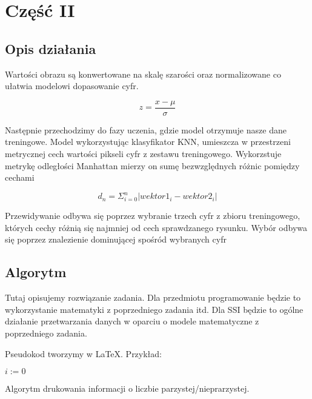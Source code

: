 \documentclass[12pt,a4paper]{article}
\begin{document}
	\section*{Część II}
	\subsection*{Opis działania} 
    Wartości obrazu są konwertowane na skalę szarości oraz normalizowane co ułatwia modelowi dopasowanie cyfr.

    \[
            z=\frac{x-\mu}{\sigma}
    \]

    Następnie przechodzimy do fazy uczenia, gdzie model otrzymuje nasze dane treningowe. Model wykorzystując klasyfikator KNN, umieszcza w przestrzeni metrycznej cech wartości pikseli cyfr z zestawu treningowego. Wykorzstuje metrykę odległości Manhattan mierzy on sumę bezwzględnych różnic pomiędzy cechami

    \[
        d_{n}=\Sigma^{n}_{i=0}|wektor1_{i}-wektor2_{i}|
    \]

    Przewidywanie odbywa się poprzez wybranie trzech cyfr z zbioru treningowego, których cechy różnią się najmniej od cech sprawdzanego rysunku. Wybór odbywa się poprzez znalezienie dominującej spośród wybranych cyfr

	\subsection*{Algorytm}
	Tutaj opisujemy rozwiązanie zadania. Dla przedmiotu programowanie będzie to wykorzystanie matematyki z poprzedniego zadania itd. Dla SSI będzie to ogólne działanie przetwarzania danych w oparciu o modele matematyczne z poprzedniego zadania. 
	
	Pseudokod tworzymy w \LaTeX. Przykład:\\
	\begin{algorithm}[H]
		$i:=0$\;
		\caption{Algorytm drukowania informacji o liczbie parzystej/nieprarzystej.}
	\end{algorithm}
\end{document}
